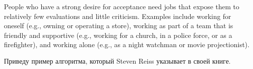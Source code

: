 \documentclass[11pt]{article}
\theoremstyle{remark}
\theoremstyle{definition}
\begin{document}




People who have a strong desire for acceptance need jobs that expose them to relatively few evaluations and little criticism. Examples include working for oneself (e.g., owning or operating a store), working as part of a team that is friendly and supportive (e.g., working for a church, in a police force, or as a firefighter), and working alone (e.g., as a night watchman or movie projectionist).


Приведу пример алгоритма, который Steven Reiss указывает в своей книге.
\end{document}
